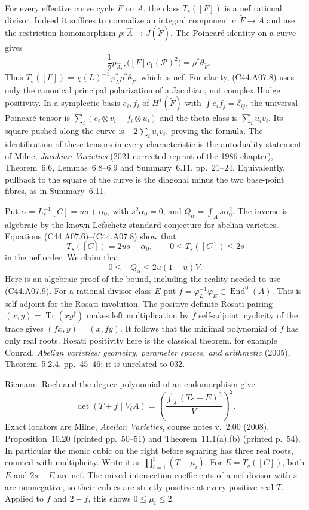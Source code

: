 \documentclass[11pt]{article}
\theoremstyle{remark}\newtheorem{remark}[theorem]{Remark}
\begin{document}
For every effective curve cycle $F$ on $A$, the class $T_s([F])$
is a nef rational divisor. Indeed it suffices to normalize an
integral component $\nu:\widetilde F\to A$ and use the restriction
homomorphism $\rho:\widehat A\to J(\widetilde F)$. The Poincar\'e
identity on a curve gives
\[
 -\frac12 p_{\widehat A,*}
       \bigl([F]c_1(\mathcal P)^2\bigr)=\rho^*\theta_{\widetilde F}.
 \tag{C44.A07.8}
\]
Thus $T_s([F])=\chi(L)^{-1}\varphi_L^*\rho^*\theta_{\widetilde F}$,
which is nef. For clarity, (C44.A07.8) uses only the canonical
principal polarization of a Jacobian, not complex Hodge positivity.
In a symplectic basis $e_i,f_i$ of $H^1(\widetilde F)$ with
$\int e_if_j=\delta_{ij}$, the universal Poincar\'e tensor is
$\sum_i(e_i\otimes v_i-f_i\otimes u_i)$ and the theta class is
$\sum_i u_iv_i$. Its square pushed along the curve is
$-2\sum_i u_iv_i$, proving the formula. The identification of these
tensors in every characteristic is the autoduality statement of
Milne, \emph{Jacobian Varieties} (2021 corrected reprint of the
1986 chapter), Theorem~6.6, Lemmas~6.8--6.9 and Summary~6.11,
pp.~21--24. Equivalently, pullback to the square of the curve is
the diagonal minus the two base-point fibres, as in Summary~6.11.

Put $\alpha=L_s^{-1}[C]=us+\alpha_0$, with $s^2\alpha_0=0$,
and $Q_\alpha=\int_A s\alpha_0^2$. The inverse is algebraic by the
known Lefschetz standard conjecture for abelian varieties.
Equations (C44.A07.6)--(C44.A07.8) show that
\[
 T_s([C])=2us-\alpha_0,
 \qquad 0\le T_s([C])\le2s
 \tag{C44.A07.9}
\]
in the nef order. We claim that
\[
 0\le -Q_\alpha\le 2u(1-u)V.
 \tag{C44.A07.10}
\]
Here is an algebraic proof of the bound, including the reality
needed to use (C44.A07.9). For a rational divisor class $E$ put
$f=\varphi_L^{-1}\varphi_E\in\operatorname{End}^0(A)$. This is
self-adjoint for the Rosati involution. The positive definite
Rosati pairing $(x,y)=\operatorname{Tr}(xy^\dagger)$ makes left
multiplication by $f$ self-adjoint: cyclicity of the trace gives
$(fx,y)=(x,fy)$. It follows that the minimal polynomial of $f$
has only real roots. Rosati positivity here is the classical
theorem, for example Conrad, \emph{Abelian varieties: geometry,
parameter spaces, and arithmetic} (2005), Theorem~5.2.4,
pp.~45--46; it is unrelated to 032.

Riemann--Roch and the degree polynomial of an endomorphism give
\[
 \det(T+f\mid V_\ell A)
   =\left(\frac{\int_A(Ts+E)^3}{V}\right)^2.
 \tag{C44.A07.11}
\]
Exact locators are Milne, \emph{Abelian Varieties}, course notes
v.~2.00 (2008), Proposition~10.20 (printed pp.~50--51) and
Theorem~11.1(a),(b) (printed p.~54). In particular the monic cubic
on the right before squaring has three real roots, counted with
multiplicity. Write it as $\prod_{i=1}^3(T+\mu_i)$.
For $E=T_s([C])$, both $E$ and $2s-E$ are nef. The mixed
intersection coefficients of a nef divisor with $s$ are
nonnegative, so their cubics are strictly positive at every
positive real $T$. Applied to $f$ and $2-f$, this shows
$0\le\mu_i\le2$.
\end{document}
